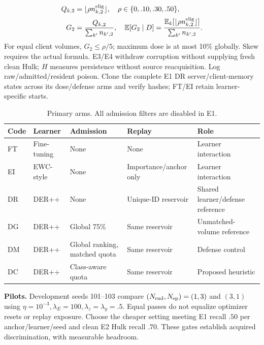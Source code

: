 \documentclass[10pt,a4paper]{article}
\begin{document}
\begin{equation}
\begin{aligned}
Q_{k,2}&=\lfloor\rho n^{\rm elig}_{k,2}\rfloor,\quad \rho\in\{0,.10,.30,.50\},\\
G_2&=\frac{Q_{k,2}}{\sum_{k'} n_{k',2}},\quad
\mathbb E[G_2\mid D]=\frac{\mathbb E_k[\lfloor\rho n^{\rm elig}_{k,2}\rfloor]}{\sum_{k'} n_{k',2}}.
\end{aligned}
\label{eq:dose}
\end{equation}
For equal client volumes, $G_2\le\rho/5$; maximum dose is at most 10\% globally. Skew requires the actual formula. E3/E4 withdraw corruption without supplying fresh clean Hulk; $H$ measures persistence without source reacquisition. Log raw/admitted/resident poison. Clone the complete E1 DR server/client-memory states across its dose/defense arms and verify hashes; FT/EI retain learner-specific starts.

\begin{table}[htbp]
\centering\footnotesize
\caption{Primary arms. All admission filters are disabled in E1.}
\label{tab:arms}
\begin{tabularx}{\linewidth}{L{1.0cm}L{1.2cm}Y Y Y}
\toprule
Code & Learner & Admission & Replay & Role\\
\midrule
FT & Fine-tuning & None & None & Learner interaction\\
EI & EWC-style & None & Importance/anchor only & Learner interaction\\
DR & DER++ & None & Unique-ID reservoir & Shared learner/defense reference\\
DG & DER++ & Global 75\% & Same reservoir & Unmatched-volume reference\\
DM & DER++ & Global ranking, matched quota & Same reservoir & Defense control\\
DC & DER++ & Class-aware quota & Same reservoir & Proposed heuristic\\
\bottomrule
\end{tabularx}
\end{table}

\textbf{Pilots.} Development seeds 101--103 compare $(N_{\rm rnd},N_{\rm ep})=(1,3)$ and $(3,1)$ using $\eta=10^{-3},\lambda_E=100,\lambda_z=\lambda_y=.5$. Equal passes do not equalize optimizer resets or replay exposure. Choose the cheaper setting meeting E1 recall $.50$ per anchor/learner/seed and clean E2 Hulk recall $.70$. These gates establish acquired discrimination, with measurable headroom.
\end{document}
